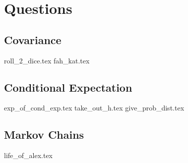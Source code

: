 \documentclass{exam}
\begin{document}
\section{Questions}
\subsection{Covariance}
\begin{enumerate}
{roll_2_dice.tex}
{fah_kat.tex}
\end{enumerate}
\subsection{Conditional Expectation}
\begin{enumerate}
{exp_of_cond_exp.tex}
{take_out_h.tex}
{give_prob_dist.tex}
\end{enumerate}
\subsection{Markov Chains}
\begin{enumerate}
{life_of_alex.tex}
\end{enumerate}
\end{document}
